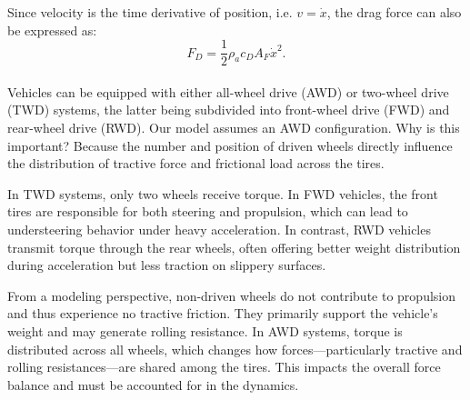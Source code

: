 Since velocity is the time derivative of position, i.e. $v=\dot x$, the drag force can also be expressed as:
\begin{equation*}
	F_D = \frac{1}{2}\rho_a c_D A_F \dot x^2.
\end{equation*}
\\
Vehicles can be equipped with either all-wheel drive (AWD) or two-wheel drive (TWD) systems, the latter being subdivided into front-wheel drive (FWD) and rear-wheel drive (RWD). Our model assumes an AWD configuration. Why is this important? Because the number and position of driven wheels directly influence the distribution of tractive force and frictional load across the tires.
	
In TWD systems, only two wheels receive torque. In FWD vehicles, the front tires are responsible for both steering and propulsion, which can lead to understeering behavior under heavy acceleration. In contrast, RWD vehicles transmit torque through the rear wheels, often offering better weight distribution during acceleration but less traction on slippery surfaces.
	
From a modeling perspective, non-driven wheels do not contribute to propulsion and thus experience no tractive friction. They primarily support the vehicle's weight and may generate rolling resistance. In AWD systems, torque is distributed across all wheels, which changes how forces—particularly tractive and rolling resistances—are shared among the tires. This impacts the overall force balance and must be accounted for in the dynamics.
	

